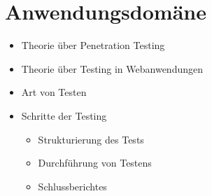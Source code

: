 \section{Anwendungsdomäne}

\begin{itemize}
    \item Theorie über Penetration Testing
    \item Theorie über Testing in Webanwendungen
    \item Art von Testen
    \item Schritte der Testing
    \begin{itemize}
        \item Strukturierung des Tests
        \item Durchführung von Testens
        \item Schlussberichtes
    \end{itemize}
\end{itemize}